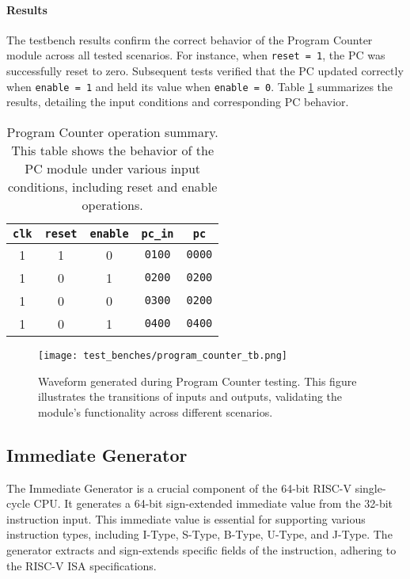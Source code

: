 \documentclass[12pt]{article}
\begin{document}
\paragraph{Results}
The testbench results confirm the correct behavior of the Program Counter module across all tested scenarios. For instance, when \texttt{reset = 1}, the PC was successfully reset to zero. Subsequent tests verified that the PC updated correctly when \texttt{enable = 1} and held its value when \texttt{enable = 0}. Table \ref{tab:program_counter_results} summarizes the results, detailing the input conditions and corresponding PC behavior.

\begin{table}[ht!]
    \centering
    \renewcommand{\arraystretch}{1.1}
    \setlength{\tabcolsep}{6pt}
    \begin{tabular}{|c|c|c|c|c|}
        \hline
        \textbf{\texttt{clk}} & \textbf{\texttt{reset}} & \textbf{\texttt{enable}} & \textbf{\texttt{pc\_in}} & \textbf{\texttt{pc}} \\
        \hline
        1 & 1 & 0 & \texttt{0100} & \texttt{0000} \\
        1 & 0 & 1 & \texttt{0200} & \texttt{0200} \\
        1 & 0 & 0 & \texttt{0300} & \texttt{0200} \\
        1 & 0 & 1 & \texttt{0400} & \texttt{0400} \\
        \hline
    \end{tabular}
    \caption{Program Counter operation summary. This table shows the behavior of the PC module under various input conditions, including reset and enable operations.}
    \label{tab:program_counter_results}
\end{table}

\begin{figure}[ht!]
    \centering
    \texttt{[image: test\_benches/program\_counter\_tb.png]}
    \caption{Waveform generated during Program Counter testing. This figure illustrates the transitions of inputs and outputs, validating the module's functionality across different scenarios.}
    \label{fig:program_counter_waveform}
\end{figure}

\subsection*{Immediate Generator}

The Immediate Generator is a crucial component of the 64-bit RISC-V single-cycle CPU. It generates a 64-bit sign-extended immediate value from the 32-bit instruction input. This immediate value is essential for supporting various instruction types, including I-Type, S-Type, B-Type, U-Type, and J-Type. The generator extracts and sign-extends specific fields of the instruction, adhering to the RISC-V ISA specifications.
\end{document}
